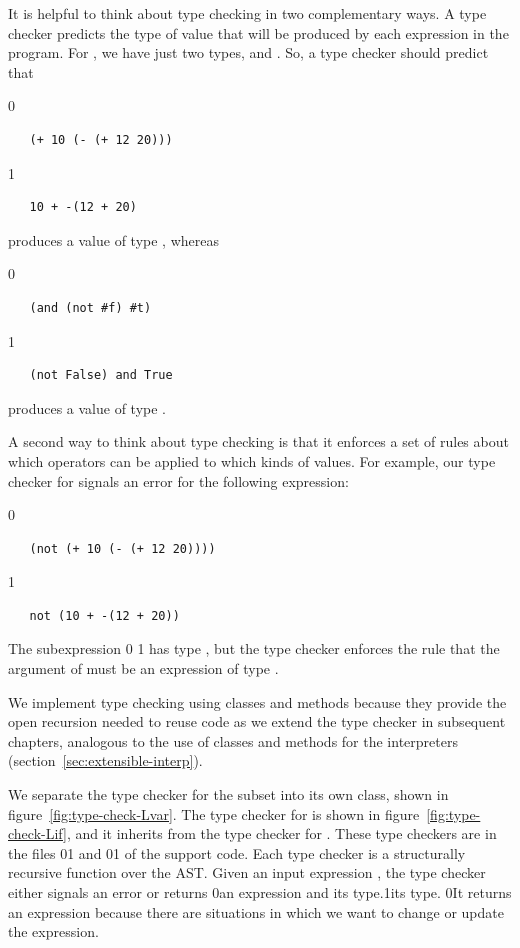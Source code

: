 \documentclass[7x10]{TimesAPriori_MIT}%
\def\racketEd{0}
\def\pythonEd{1}
\def\edition{1}
\newcommand{\racket}[1]{{\if\edition\racketEd{#1}\fi}}
\newcommand{\pythonColor}[0]{}
\newcommand{\python}[1]{{\if\edition\pythonEd\pythonColor #1\fi}}
\numberwithin{theorem}{chapter}
\numberwithin{definition}{chapter}
\numberwithin{equation}{chapter}
\begin{document}
It is helpful to think about type checking in two complementary ways. A type checker predicts the
type of value that will be produced by each expression in the program.
For \LangIf{}, we have just two types, \INTTY{} and \BOOLTY{}. So, a
type checker should predict that {\if\edition\racketEd
\begin{lstlisting}
   (+ 10 (- (+ 12 20)))
\end{lstlisting}
\fi}
{\if\edition\pythonEd\pythonColor
\begin{lstlisting}
   10 + -(12 + 20)
\end{lstlisting}
\fi}
\noindent produces a value of type \INTTY{}, whereas
{\if\edition\racketEd
\begin{lstlisting}
   (and (not #f) #t)
\end{lstlisting}
\fi}
{\if\edition\pythonEd\pythonColor
\begin{lstlisting}
   (not False) and True
\end{lstlisting}
\fi}
\noindent produces a value of type \BOOLTY{}.

A second way to think about type checking is that it enforces a set of
rules about which operators can be applied to which kinds of
values. For example, our type checker for \LangIf{} signals an error
for the following expression:
%
{\if\edition\racketEd
\begin{lstlisting}
   (not (+ 10 (- (+ 12 20))))
\end{lstlisting}
\fi}
{\if\edition\pythonEd\pythonColor
\begin{lstlisting}
   not (10 + -(12 + 20))
\end{lstlisting}
\fi}
\noindent The subexpression
\racket{}
\python{}
has type \INTTY{}, but the type checker enforces the rule that the
argument of  must be an expression of type \BOOLTY{}.

We implement type checking using classes and methods because they
provide the open recursion needed to reuse code as we extend the type
checker in subsequent chapters, analogous to the use of classes and methods
for the interpreters (section~\ref{sec:extensible-interp}).

We separate the type checker for the \LangVar{} subset into its own
class, shown in figure~\ref{fig:type-check-Lvar}. The type checker for
\LangIf{} is shown in figure~\ref{fig:type-check-Lif}, and it inherits
from the type checker for \LangVar{}. These type checkers are in the
files
\racket{}\python{}
and
\racket{}\python{}
of the support code.
%
Each type checker is a structurally recursive function over the AST.
Given an input expression , the type checker either signals an
error or returns \racket{an expression and its type.}\python{its type.}
%
\racket{It returns an expression because there are situations in which
  we want to change or update the expression.}
\end{document}
